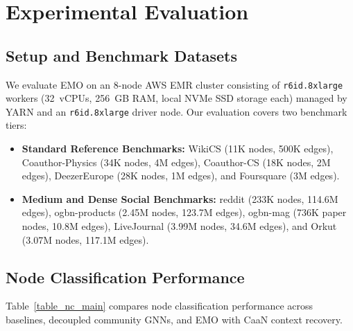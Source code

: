 \documentclass[conference,compsoc]{IEEEtran}
\begin{document}
\section{Experimental Evaluation}
\label{sec:experiments}

\subsection{Setup and Benchmark Datasets}
We evaluate EMO on an 8-node AWS EMR cluster consisting of \texttt{r6id.8xlarge} workers (32~vCPUs, 256~GB RAM, local NVMe SSD storage each) managed by YARN and an \texttt{r6id.8xlarge} driver node. Our evaluation covers two benchmark tiers:
\begin{itemize}
    \item \textbf{Standard Reference Benchmarks:} WikiCS (11K nodes, 500K edges), Coauthor-Physics (34K nodes, 4M edges), Coauthor-CS (18K nodes, 2M edges), DeezerEurope (28K nodes, 1M edges), and Foursquare (3M edges).
    \item \textbf{Medium and Dense Social Benchmarks:} reddit (233K nodes, 114.6M edges), ogbn-products (2.45M nodes, 123.7M edges), ogbn-mag (736K paper nodes, 10.8M edges), LiveJournal (3.99M nodes, 34.6M edges), and Orkut (3.07M nodes, 117.1M edges).
\end{itemize}

\subsection{Node Classification Performance}
Table~\ref{table_nc_main} compares node classification performance across baselines, decoupled community GNNs, and EMO with CaaN context recovery.


\end{document}
